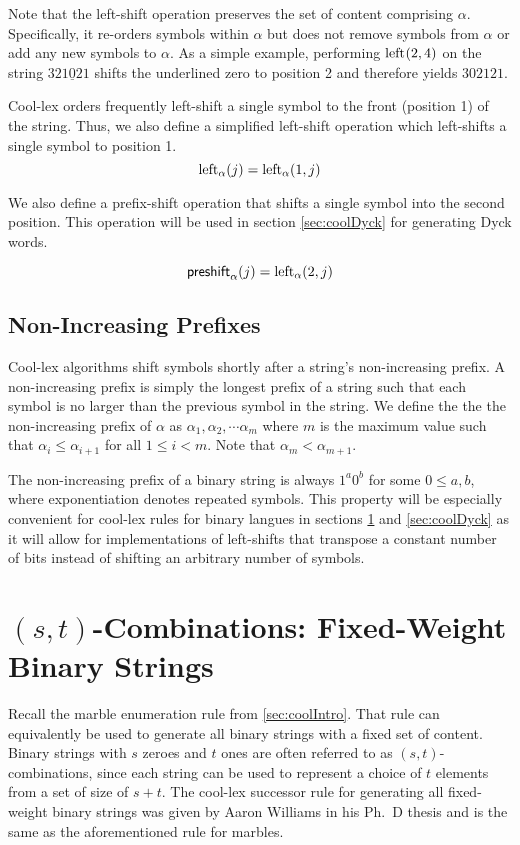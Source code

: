 Note that the left-shift operation preserves the set of content comprising $\alpha$.  Specifically, it re-orders symbols within $\alpha$ but does not remove symbols from $\alpha$ or add any new symbols to $\alpha$. 
As a simple example, performing $\lshiftindex{2}{4}$ on the string $321\underline{0}21$ shifts the underlined zero to position 2 and therefore yields $302121$.

Cool-lex orders frequently left-shift a single symbol to the front (position 1) of the string.  Thus, we also define a simplified left-shift operation which left-shifts a single symbol to position 1.  
\begin{equation} \label{eq:simpleleftdef}
\leftshift[\alpha]{j}=\lshiftindex[\alpha]{1}{j}
\end{equation}

We also define a prefix-shift operation that shifts a single symbol into the second position. This operation will be used in section \ref{sec:coolDyck} for generating Dyck words.

\begin{equation} \label{eq:preshiftdef}
\preshift{\alpha}{j}=\lshiftindex[\alpha]{2}{j}
\end{equation}


\subsection{Non-Increasing Prefixes}
Cool-lex algorithms  shift symbols shortly after a string's non-increasing prefix.  A non-increasing prefix is simply the longest prefix of a string such that each symbol is no larger than the previous symbol in the string.  We define the the the non-increasing prefix of $\alpha$ as $\alpha_1,\alpha_2,\cdots\alpha_m$ where $m$ is 
the maximum value such that $\alpha_{i} \le \alpha_{i+1}$ for all $1 \le i < m$. Note that $\alpha_m < \alpha_{m+1}$. 

The non-increasing prefix of a binary string is always $1^a0^b$ for some $0 \le a,b$, where exponentiation denotes repeated symbols.  This property will be especially convenient for cool-lex rules for binary langues in sections \ref{sec:coolCombo} and \ref{sec:coolDyck} as it will allow for implementations of left-shifts that transpose a constant number of bits instead of shifting an arbitrary number of symbols.

\section{$(s,t)$-Combinations: Fixed-Weight Binary Strings} \label{sec:coolCombo}
Recall the marble enumeration rule from \ref{sec:coolIntro}.  That rule can equivalently be used to generate all binary strings with a fixed set of content.  
Binary strings with $s$ zeroes and $t$ ones are often referred to as $(s,t)$-combinations, since each string can be used to represent a choice of $t$ elements from a set of size of $s+t$.  The cool-lex successor rule for generating all fixed-weight binary strings was given by Aaron Williams in his Ph.\ D thesis \cite{williams2009shift} and is the same as the aforementioned rule for marbles.

